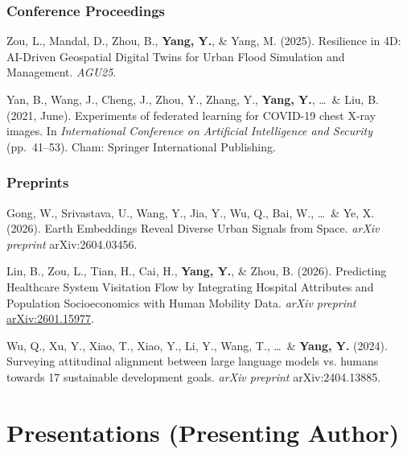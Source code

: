 \documentclass[10pt,letterpaper]{article}
\newenvironment{reflist}
  {\begin{list}{}{%
     \setlength{\leftmargin}{1.7em}\setlength{\itemindent}{-1.7em}%
     \setlength{\itemsep}{0.22em}\setlength{\parsep}{0pt}\setlength{\topsep}{0.25em}}}
  {\end{list}}
\begin{document}
\subsubsection{Conference Proceedings}
\begin{reflist}
  \item[] [1] Zou, L., Mandal, D., Zhou, B., \textbf{Yang, Y.}, \& Yang, M. (2025). Resilience in 4D: AI-Driven Geospatial Digital Twins for Urban Flood Simulation and Management. \textit{AGU25}.
  \item[] [2] Yan, B., Wang, J., Cheng, J., Zhou, Y., Zhang, Y., \textbf{Yang, Y.}, \ldots\ \& Liu, B. (2021, June). Experiments of federated learning for COVID-19 chest X-ray images. In \textit{International Conference on Artificial Intelligence and Security} (pp.~41--53). Cham: Springer International Publishing.
\end{reflist}

\subsubsection{Preprints}
\begin{reflist}
  \item[] [1] Gong, W., Srivastava, U., Wang, Y., Jia, Y., Wu, Q., Bai, W., \ldots\ \& Ye, X. (2026). Earth Embeddings Reveal Diverse Urban Signals from Space. \textit{arXiv preprint} arXiv:2604.03456.
  \item[] [2] Lin, B., Zou, L., Tian, H., Cai, H., \textbf{Yang, Y.}, \& Zhou, B. (2026). Predicting Healthcare System Visitation Flow by Integrating Hospital Attributes and Population Socioeconomics with Human Mobility Data. \textit{arXiv preprint} \href{https://arxiv.org/abs/2601.15977}{arXiv:2601.15977}.
  \item[] [3] Wu, Q., Xu, Y., Xiao, T., Xiao, Y., Li, Y., Wang, T., \ldots\ \& \textbf{Yang, Y.} (2024). Surveying attitudinal alignment between large language models vs. humans towards 17 sustainable development goals. \textit{arXiv preprint} arXiv:2404.13885.
\end{reflist}

\section{Presentations (Presenting Author)}
\end{document}

